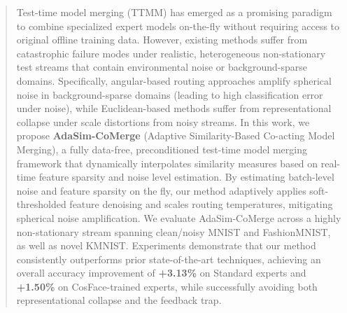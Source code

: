 \documentclass{article}
\theoremstyle{plain}
\theoremstyle{definition}
\theoremstyle{remark}
\begin{document}

\printAffiliationsAndNotice{}

\begin{abstract}
Test-time model merging (TTMM) has emerged as a promising paradigm to combine specialized expert models on-the-fly without requiring access to original offline training data. However, existing methods suffer from catastrophic failure modes under realistic, heterogeneous non-stationary test streams that contain environmental noise or background-sparse domains. Specifically, angular-based routing approaches amplify spherical noise in background-sparse domains (leading to high classification error under noise), while Euclidean-based methods suffer from representational collapse under scale distortions from noisy streams. In this work, we propose \textbf{AdaSim-CoMerge} (Adaptive Similarity-Based Co-acting Model Merging), a fully data-free, preconditioned test-time model merging framework that dynamically interpolates similarity measures based on real-time feature sparsity and noise level estimation. By estimating batch-level noise and feature sparsity on the fly, our method adaptively applies soft-thresholded feature denoising and scales routing temperatures, mitigating spherical noise amplification. We evaluate AdaSim-CoMerge across a highly non-stationary stream spanning clean/noisy MNIST and FashionMNIST, as well as novel KMNIST. Experiments demonstrate that our method consistently outperforms prior state-of-the-art techniques, achieving an overall accuracy improvement of \textbf{+3.13\%} on Standard experts and \textbf{+1.50\%} on CosFace-trained experts, while successfully avoiding both representational collapse and the feedback trap.
\end{abstract}
\end{document}
